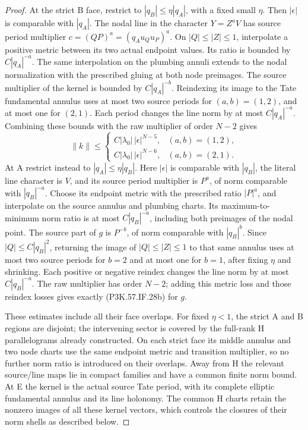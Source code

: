 \begin{proof}
At the strict B face, restrict to
\(|q_B|\le\eta|q_A|\), with a fixed small \(\eta\).
Then \(|\epsilon|\) is comparable with \(|q_A|\).
The nodal line in the character \(Y=Z^aV\) has source
period multiplier \(c=(QP)^a=(q_Au_Qu_P)^a\).
On \(|Q|\le|Z|\le1\), interpolate a positive metric
between its two actual endpoint values. Its ratio is
bounded by \(C|q_A|^{-a}\). The same interpolation on
the plumbing annuli extends to the nodal normalization
with the prescribed gluing at both node preimages.
The source multiplier of the kernel is bounded by
\(C|q_A|^{-b}\). Reindexing its image to the Tate
fundamental annulus uses at most two source periods
for \((a,b)=(1,2)\), and at most one for \((2,1)\).
Each period changes the line norm by at most
\(C|q_A|^{-a}\). Combining these bounds with the
raw multiplier of order \(N-2\) gives
\[
 \|k\|\le
 \begin{cases}
 C|\lambda_0|\,|\epsilon|^{N-5},&(a,b)=(1,2),\\
 C|\lambda_0|\,|\epsilon|^{N-6},&(a,b)=(2,1).
 \end{cases}                                            \tag{P3K.57.IF.28b}
\]
At A restrict instead to \(|q_A|\le\eta|q_B|\).
Here \(|\epsilon|\) is comparable with \(|q_B|\),
the literal line character is \(V\), and its source
period multiplier is \(P^a\), of norm comparable
with \(|q_B|^{-a}\). Choose its endpoint metric
with the prescribed ratio \(|P|^a\), and interpolate
on the source annulus and plumbing charts. Its
maximum-to-minimum norm ratio is at most
\(C|q_B|^{-a}\), including both preimages of the
nodal point. The source part of \(g\) is
\(P^{-b}\), of norm comparable with \(|q_B|^b\).
Since \(|Q|\le C|q_B|^2\), returning the image of
\(|Q|\le|Z|\le1\) to that same annulus uses at most
two source periods for \(b=2\) and at most one for
\(b=1\), after fixing \(\eta\) and shrinking.
Each positive or negative reindex changes the line
norm by at most \(C|q_B|^{-a}\). The raw multiplier
has order \(N-2\); adding this metric loss and those
reindex losses gives exactly (P3K.57.IF.28b) for \(g\).

These estimates include all their face overlaps.
For fixed \(\eta<1\), the strict A and B regions
are disjoint; the intervening sector is covered by
the full-rank H parallelograms already constructed.
On each strict face its middle annulus and two node
charts use the same endpoint metric and transition
multiplier, so no further norm ratio is introduced
on their overlaps. Away from H the relevant
source/line maps lie in compact families and have
a common finite norm bound. At E the kernel is
the actual source Tate period, with its complete
elliptic fundamental annulus and its line holonomy.
The common H charts retain the nonzero images of
all these kernel vectors, which controls the
closures of their norm shells as described below.


\end{proof}
